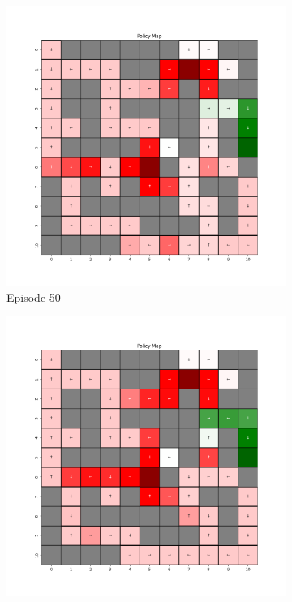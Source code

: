 \documentclass{assignment}
\begin{document}
\begin{figure}[H]
\begin{subfigure}{0.3\textwidth}
        \includegraphics[width=\textwidth]{figures/policy_td/alpha_sweep/policy_alpha_1_gamma_0.95_epsilon_0.2_iteration_50.png}
    \caption{Episode 50}
    \end{subfigure}\hfill
    \begin{subfigure}{0.3\textwidth}
        \includegraphics[width=\textwidth]{figures/policy_td/alpha_sweep/policy_alpha_1_gamma_0.95_epsilon_0.2_iteration_100.png}

\end{subfigure}
\end{figure}
\end{document}

